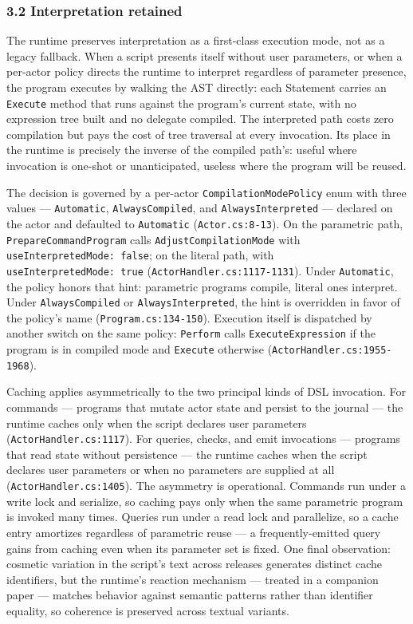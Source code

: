 \documentclass[
]{article}
\let\origtexttt\texttt%
\renewcommand{\texttt}[1]{\origtexttt{\seqsplit{#1}}}%
\let\texttt\origtexttt%
\begin{document}
\subsubsection{3.2 Interpretation
retained}\label{interpretation-retained}

The runtime preserves interpretation as a first-class execution mode,
not as a legacy fallback. When a script presents itself without user
parameters, or when a per-actor policy directs the runtime to interpret
regardless of parameter presence, the program executes by walking the
AST directly: each Statement carries an \texttt{Execute} method that
runs against the program's current state, with no expression tree built
and no delegate compiled. The interpreted path costs zero compilation
but pays the cost of tree traversal at every invocation. Its place in
the runtime is precisely the inverse of the compiled path's: useful
where invocation is one-shot or unanticipated, useless where the program
will be reused.

The decision is governed by a per-actor \texttt{CompilationModePolicy}
enum with three values --- \texttt{Automatic}, \texttt{AlwaysCompiled},
and \texttt{AlwaysInterpreted} --- declared on the actor and defaulted
to \texttt{Automatic} (\texttt{Actor.cs:8-13}). On the parametric path,
\texttt{PrepareCommandProgram} calls \texttt{AdjustCompilationMode} with
\texttt{useInterpretedMode:\ false}; on the literal path, with
\texttt{useInterpretedMode:\ true} (\texttt{ActorHandler.cs:1117-1131}).
Under \texttt{Automatic}, the policy honors that hint: parametric
programs compile, literal ones interpret. Under \texttt{AlwaysCompiled}
or \texttt{AlwaysInterpreted}, the hint is overridden in favor of the
policy's name (\texttt{Program.cs:134-150}). Execution itself is
dispatched by another switch on the same policy: \texttt{Perform} calls
\texttt{ExecuteExpression} if the program is in compiled mode and
\texttt{Execute} otherwise (\texttt{ActorHandler.cs:1955-1968}).

Caching applies asymmetrically to the two principal kinds of DSL
invocation. For commands --- programs that mutate actor state and
persist to the journal --- the runtime caches only when the script
declares user parameters (\texttt{ActorHandler.cs:1117}). For queries,
checks, and emit invocations --- programs that read state without
persistence --- the runtime caches when the script declares user
parameters or when no parameters are supplied at all
(\texttt{ActorHandler.cs:1405}). The asymmetry is operational. Commands
run under a write lock and serialize, so caching pays only when the same
parametric program is invoked many times. Queries run under a read lock
and parallelize, so a cache entry amortizes regardless of parametric
reuse --- a frequently-emitted query gains from caching even when its
parameter set is fixed. One final observation: cosmetic variation in the
script's text across releases generates distinct cache identifiers, but
the runtime's reaction mechanism --- treated in a companion paper ---
matches behavior against semantic patterns rather than identifier
equality, so coherence is preserved across textual variants.
\end{document}
